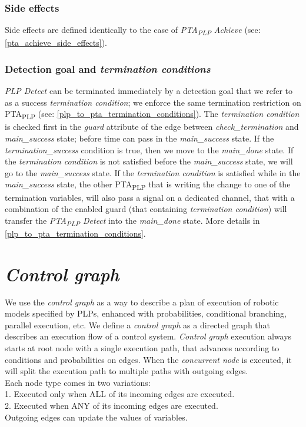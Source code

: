 \subsection{Side effects}
Side effects are defined identically to the case of \textit{PTA\textsubscript{PLP} Achieve} (see: \ref{pta_achieve_side_effects}). \\
\subsection{Detection goal and \textit{termination conditions} }
\textit{PLP Detect} can be terminated immediately by a detection goal that we refer to as a success \textit{termination condition}; we enforce the same termination restriction on PTA\textsubscript{PLP} (see: \ref{plp_to_pta_termination_conditions}). The \textit{termination condition} is checked first in the \textit{guard} attribute of the edge between \textcolor{ColorUppaalState}{\textit{check_termination}} and \textcolor{ColorUppaalState}{\textit{main_success}} state; before time can pass in the \textcolor{ColorUppaalState}{\textit{main_success}} state. If the \textcolor{ColorEdgeGuard}{\textit{termination_success}} condition is true, then we move to the \textcolor{ColorUppaalState}{\textit{main_done}} state. If the \textit{termination condition} is not satisfied before the \textcolor{ColorUppaalState}{\textit{main_success}} state, we will go to the \textcolor{ColorUppaalState}{\textit{main_success}} state. If the \textit{termination condition} is satisfied while in the \textcolor{ColorUppaalState}{\textit{main_success}} state, the other PTA\textsubscript{PLP} that is writing the change to one of the termination variables, will also pass a signal on a dedicated channel, that with a combination of the enabled guard (that containing \textit{termination condition}) will transfer the \textit{PTA\textsubscript{PLP} Detect} into the \textcolor{ColorUppaalState}{\textit{main_done}} state. More details in \ref{plp_to_pta_termination_conditions}. \\
\clearpage
\chapter{\textit{Control graph}}
We use the \textit{control graph} as a way to describe a plan of execution of robotic models specified by PLPs, enhanced with probabilities, conditional branching, parallel execution, etc. We define a \textit{control graph} as a directed graph that describes an execution flow of a control system. \textit{Control graph} execution always starts at root node with a single execution path, that advances according to conditions and probabilities on edges. When the \textit{concurrent node} is executed, it will split the execution path to multiple paths with outgoing edges. \\
Each node type comes in two variations: \\
            1. Executed only when ALL of its incoming edges are executed.\\
            2. Executed when ANY of its incoming edges are executed.\\
Outgoing edges can update the values of variables.\\
\clearpage
